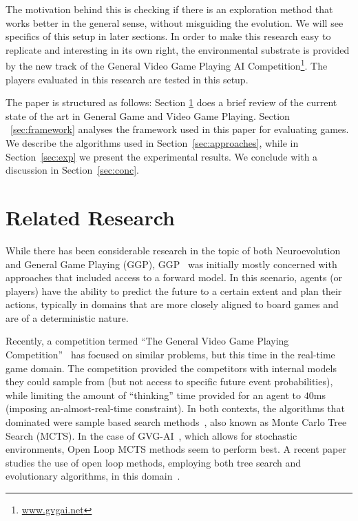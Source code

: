 \documentclass[conference]{IEEEtran}
\begin{document}
The motivation behind this is checking if there is an exploration method that works better in the general sense, without misguiding the evolution. We will see specifics of this setup in later sections. In order to make this research easy to replicate and interesting in its own right, the environmental substrate is provided by the new track of the General Video Game Playing AI Competition\footnote{\url{www.gvgai.net}}. The players evaluated in this research are tested in this setup.

The paper is structured as follows: Section \ref{sec:lit} does a brief review of the current state of the art in General Game and Video Game Playing. Section ~\ref{sec:framework} analyses the framework used in this paper for evaluating games. We describe the algorithms used in Section~\ref{sec:approaches}, while in Section~\ref{sec:exp} we present the experimental results. We conclude with a discussion in Section~\ref{sec:conc}. 
 
\section{Related Research} \label{sec:lit}

While there has been considerable research in the topic of both Neuroevolution and General Game Playing (GGP), GGP~\cite{genesereth2005general} was initially mostly concerned with approaches that included access to a forward model. In this scenario, agents (or players) have the ability to predict the future to a certain extent and plan their actions, typically in domains that are more closely aligned to board games and are of a deterministic nature.

Recently, a competition termed ``The General Video Game Playing Competition''~\cite{Perez2015} has focused on similar problems, but this time in the real-time game domain. The competition provided the competitors with internal models they could sample from (but not access to specific future event probabilities), while limiting the amount of ``thinking'' time provided for an agent to $40$ms (imposing an-almost-real-time constraint). In both contexts, the algorithms that dominated were sample based search methods~\cite{finnsson2008simulation, Perez2015}, also known as Monte Carlo Tree Search (MCTS). In the case of GVG-AI~\cite{Perez2015}, which allows for stochastic environments, Open Loop MCTS methods seem to perform best. A recent paper studies the use of open loop methods, employing both tree search and evolutionary algorithms, in this domain~\cite{Perez2015a}.
\end{document}
